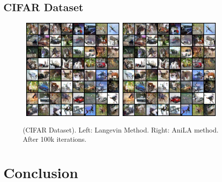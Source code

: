 \documentclass{article}
\begin{document}
\subsection{CIFAR Dataset}



\begin{figure}[H]
    \begin{center}
        \mbox{
        \includegraphics[width=2in]{figs/cifarlangevin}
        \includegraphics[width=2in]{figs/cifarlangevin}
        }
    \end{center}
    \vspace{-0.1in}
	\caption{(CIFAR Dataset). Left: Langevin Method. Right: AniLA method. After 100k iterations.}
	\label{fig:cifar}
\end{figure}


\section{Conclusion}\label{sec:conclusion}

\newpage



\end{document}
